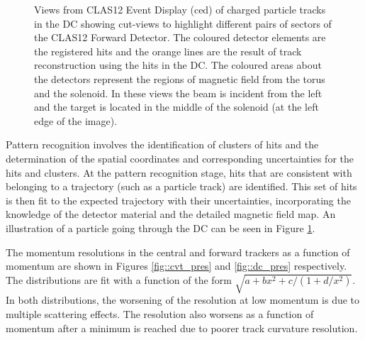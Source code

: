     \begin{figure}[t]
        \centering{}
        \caption[Particle going through DC.]{Views from CLAS12 Event Display (ced) of charged particle tracks in the DC showing cut-views to highlight different pairs of sectors of the CLAS12 Forward Detector.
        The coloured detector elements are the registered hits and the orange lines are the result of track reconstruction using the hits in the DC.
        The coloured areas about the detectors represent the regions of magnetic field from the torus and the solenoid.
        In these views the beam is incident from the left and the target is located in the middle of the solenoid (at the left edge of the image).}
        \label{fig::ced_event}
    \end{figure}

    Pattern recognition involves the identification of clusters of hits and the determination of the spatial coordinates and corresponding uncertainties for the hits and clusters.
    At the pattern recognition stage, hits that are consistent with belonging to a trajectory (such as a particle track) are identified.
    This set of hits is then fit to the expected trajectory with their uncertainties, incorporating the knowledge of the detector material and the detailed magnetic field map.
    An illustration of a particle going through the DC can be seen in Figure \ref{fig::ced_event}. 

    The momentum resolutions in the central and forward trackers as a function of momentum are shown in Figures \ref{fig::cvt_pres} and \ref{fig::dc_pres} respectively.
    The distributions are fit with a function of the form $\sqrt{a + bx^2 + c/(1 + d/x^2)}$.
    In both distributions, the worsening of the resolution at low momentum is due to multiple scattering effects.
    The resolution also worsens as a function of momentum after a minimum is reached due to poorer track curvature resolution.

